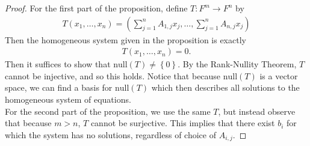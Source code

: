 \documentclass{memoir}
\begin{document}
\begin{proof}
For the first part of the proposition, define \(T:F^{m}\to F^{n}\) by
\begin{align*}
	T(x_1,\ldots,x_n) = \left( \sum_{j=1}^{n} A_{1,j}x_j, \ldots, \sum_{j=1}^{n} A_{n,j}x_j \right) 
\end{align*}
Then the homogeneous system given in the proposition is exactly
\begin{align*}
	T(x_1,\ldots,x_n) = 0.
\end{align*}
Then it suffices to show that \(\textrm{null}(T) \neq \left\{ 0 \right\} \). By the Rank-Nullity Theorem, \(T\) cannot be injective, and so this holds. Notice that because \(\textrm{null}(T)\) is a vector space, we can find a basis for \(\textrm{null}(T)\) which then describes all solutions to the homogeneous system of equations.\\

For the second part of the proposition, we use the same \(T\), but instead observe that because \(m>n\), \(T\) cannot be surjective. This implies that there exist \(b_{i}\) for which the system has no solutions, regardless of choice of \(A_{i,j}\).

\end{proof}
\end{document}
